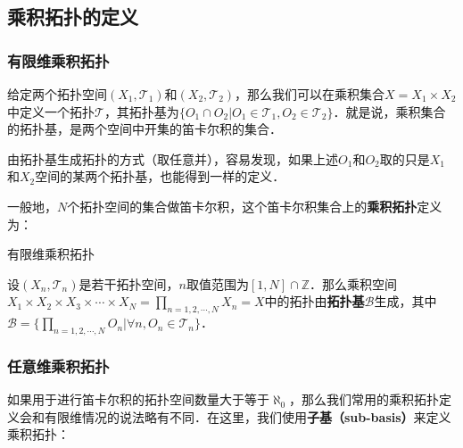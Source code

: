 
\subsection{乘积拓扑的定义}
\subsubsection{有限维乘积拓扑}

给定两个拓扑空间$(X_1, \mathcal{T}_1)$和$(X_2, \mathcal{T}_2)$，那么我们可以在乘积集合$X=X_1\times X_2$中定义一个拓扑$\mathcal{T}$，其拓扑基为$\{O_1\cap O_2|O_1\in\mathcal{T_1}, O_2\in\mathcal{T_2}\}$．就是说，乘积集合的拓扑基，是两个空间中开集的笛卡尔积的集合．

由拓扑基生成拓扑的方式（取任意并），容易发现，如果上述$O_1$和$O_2$取的只是$X_1$和$X_2$空间的某两个拓扑基，也能得到一样的定义．

一般地，$N$个拓扑空间的集合做笛卡尔积，这个笛卡尔积集合上的\textbf{乘积拓扑}定义为：

\begin{definition}{有限维乘积拓扑}

设$(X_n, \mathcal{T}_n)$是若干拓扑空间，$n$取值范围为$[1, N]\cap\mathbb{Z}$．那么乘积空间$X_1\times X_2\times X_3\times\cdots\times X_N=\prod\limits_{n=1,2,\cdots,N}X_n=X$中的拓扑由\textbf{拓扑基}$\mathcal{B}$生成，其中$\mathcal{B}=\{\prod\limits_{n=1,2,\cdots,N}O_n|\forall n, O_n\in\mathcal{T}_n\}$．

\end{definition}

\subsubsection{任意维乘积拓扑}

如果用于进行笛卡尔积的拓扑空间数量大于等于$\aleph_0$，那么我们常用的乘积拓扑定义会和有限维情况的说法略有不同．在这里，我们使用\textbf{子基（sub-basis）}来定义乘积拓扑：

